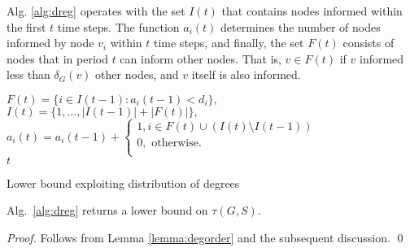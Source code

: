 Alg. \ref{alg:dreg} operates with the set $I(t)$ that contains nodes informed within the first $t$ time steps.
The function $a_i(t)$ determines the number of nodes informed by node $v_i$ within $t$ time steps, and finally,
the set $F(t)$ consists of nodes that in period $t$ can inform other nodes.
That is, $v\in F(t)$ if $v$ informed less than $\delta_G(v)$ other nodes, and $v$ itself is also informed.

\begin{algorithm}
 {
	$F(t)=\{i\in I(t-1):a_i(t-1)<d_i\},$\\
	$I(t)=\{1,\dots,|I(t-1)|+|F(t)|\},$\\
	$a_i(t)=a_i(t-1)+
	\begin{cases}
		1, i\in F(t)\cup \left(I(t)\setminus I(t-1)\right) \\
		0, \text{ otherwise. }\\
	\end{cases}$\\
	 {\Return $t$}
		
}
\caption{Lower bound exploiting distribution of degrees}
\label{alg:dreg}
\end{algorithm}


\begin{proposition}
Alg.~\ref{alg:dreg} returns a lower bound on $\tau(G,S)$.
\label{cor:deg}
\end{proposition}
\begin{proof}
		Follows from Lemma \ref{lemma:degorder} and the subsequent discussion. \qed
\end{proof}

%
%

